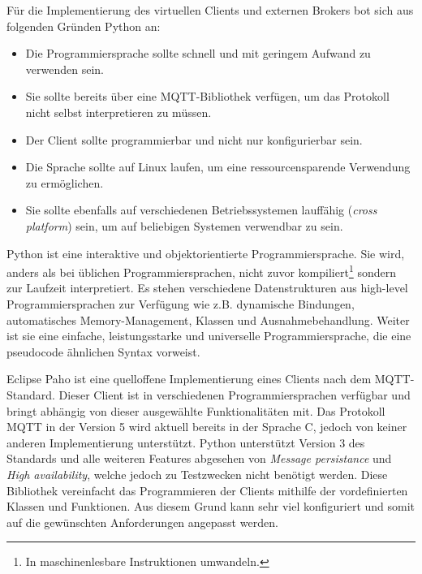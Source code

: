     Für die Implementierung des virtuellen Clients und externen Brokers bot sich aus folgenden Gründen Python an:
    \begin{itemize}
        \item Die Programmiersprache sollte schnell und mit geringem Aufwand zu verwenden sein.
        \item Sie sollte bereits über eine \ac{MQTT}-Bibliothek verfügen, um das Protokoll nicht selbst interpretieren zu müssen.
        \item Der Client sollte programmierbar und nicht nur konfigurierbar sein.
        \item Die Sprache sollte auf Linux laufen, um eine ressourcensparende Verwendung zu ermöglichen.
        \item Sie sollte ebenfalls auf verschiedenen Betriebssystemen lauffähig (\emph{cross platform}) sein, um auf beliebigen Systemen verwendbar zu sein.
    \end{itemize}
    Python ist eine interaktive und objektorientierte Programmiersprache. Sie wird, anders als bei üblichen Programmiersprachen, nicht zuvor kompiliert\footnote{In maschinenlesbare Instruktionen umwandeln.} sondern zur Laufzeit interpretiert.
    Es stehen verschiedene Datenstrukturen aus high-level Programmiersprachen zur Verfügung wie z.B. dynamische Bindungen, automatisches Memory-Management, Klassen und Ausnahmebehandlung. Weiter ist sie eine einfache, leistungsstarke und universelle Programmiersprache, die eine pseudocode ähnlichen Syntax vorweist. \cite{sanner1999python}
        
    Eclipse Paho ist eine quelloffene Implementierung eines Clients nach dem \ac{MQTT}-Standard. Dieser Client ist in verschiedenen Programmiersprachen verfügbar und bringt abhängig von dieser ausgewählte Funktionalitäten mit.
    Das Protokoll \ac{MQTT} in der Version 5 wird aktuell bereits in der Sprache C, jedoch von keiner anderen Implementierung unterstützt. Python unterstützt Version 3 des Standards und alle weiteren Features abgesehen von \emph{Message persistance} und \emph{High availability}, welche jedoch zu Testzwecken nicht benötigt werden. \cite{eclipse_foundation2017}
    Diese Bibliothek vereinfacht das Programmieren der Clients mithilfe der vordefinierten Klassen und Funktionen.
    Aus diesem Grund kann sehr viel konfiguriert und somit auf die gewünschten Anforderungen angepasst werden. 

